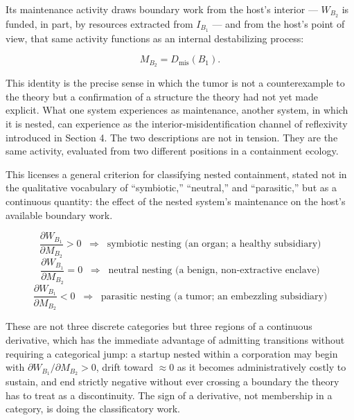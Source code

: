 \documentclass[11pt]{article}
\theoremstyle{plain}
\begin{document}
Its maintenance activity draws boundary work from the host's interior --- \(W_{B_2}\) is funded, in part, by resources extracted from \(I_{B_1}\) --- and from the host's point of view, that same activity functions as an internal destabilizing process:

\[M_{B_2} = D_{\mathrm{mis}}(B_1).\]

This identity is the precise sense in which the tumor is not a counterexample to the theory but a confirmation of a structure the theory had not yet made explicit. What one system experiences as maintenance, another system, in which it is nested, can experience as the interior-misidentification channel of reflexivity introduced in Section 4. The two descriptions are not in tension. They are the same activity, evaluated from two different positions in a containment ecology.

This licenses a general criterion for classifying nested containment, stated not in the qualitative vocabulary of ``symbiotic,'' ``neutral,'' and ``parasitic,'' but as a continuous quantity: the effect of the nested system's maintenance on the host's available boundary work.

\[\frac{\partial W_{B_1}}{\partial M_{B_2}} > 0 \;\;\Rightarrow\;\; \text{symbiotic nesting (an organ; a healthy subsidiary)}\]
\[\frac{\partial W_{B_1}}{\partial M_{B_2}} = 0 \;\;\Rightarrow\;\; \text{neutral nesting (a benign, non-extractive enclave)}\]
\[\frac{\partial W_{B_1}}{\partial M_{B_2}} < 0 \;\;\Rightarrow\;\; \text{parasitic nesting (a tumor; an embezzling subsidiary)}\]

These are not three discrete categories but three regions of a continuous derivative, which has the immediate advantage of admitting transitions without requiring a categorical jump: a startup nested within a corporation may begin with \(\partial W_{B_1}/\partial M_{B_2} > 0\), drift toward \(\approx 0\) as it becomes administratively costly to sustain, and end strictly negative without ever crossing a boundary the theory has to treat as a discontinuity. The sign of a derivative, not membership in a category, is doing the classificatory work.
\end{document}
